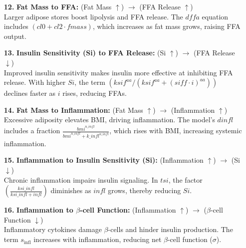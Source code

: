 \begin{itemize}
    \item[\textbf{12.}] \textbf{Fat Mass to FFA:} (Fat Mass $\uparrow$) $\rightarrow$ (FFA Release $\uparrow$) \\
    Larger adipose stores boost lipolysis and FFA release. The $dffa$ equation includes $(cl0 + cl2 \cdot fmass)$, which increases as fat mass grows, raising FFA output.
    
    \item[\textbf{13.}] \textbf{Insulin Sensitivity (Si) to FFA Release:} (Si $\uparrow$) $\rightarrow$ (FFA Release $\downarrow$) \\
    Improved insulin sensitivity makes insulin more effective at inhibiting FFA release. With higher $Si$, the term $(ksif^{aa}/(ksif^{aa}+(siff \cdot i)^{aa}))$ declines faster as $i$ rises, reducing FFAs.
    
    \item[\textbf{14.}] \textbf{Fat Mass to Inflammation:} (Fat Mass $\uparrow$) $\rightarrow$ (Inflammation $\uparrow$) \\
    Excessive adiposity elevates BMI, driving inflammation. The model's $dinfl$ includes a fraction $\frac{bmi^{n\_infl}}{bmi^{n\_infl} + k\_infl^{n\_infl}}$, which rises with BMI, increasing systemic inflammation.
    
    \item[\textbf{15.}] \textbf{Inflammation to Insulin Sensitivity (Si):} (Inflammation $\uparrow$) $\rightarrow$ (Si $\downarrow$) \\
    Chronic inflammation impairs insulin signaling. In $tsi$, the factor $(\frac{ksi\_infl}{ksi\_infl + infl})$ diminishes as $infl$ grows, thereby reducing $Si$.
    
    \item[\textbf{16.}] \textbf{Inflammation to $\beta$-cell Function:} (Inflammation $\uparrow$) $\rightarrow$ ($\beta$-cell Function $\downarrow$) \\
    Inflammatory cytokines damage $\beta$-cells and hinder insulin production. The term $s_{\text{infl}}$ increases with inflammation, reducing net $\beta$-cell function ($\sigma$).
        
\end{itemize}
    
